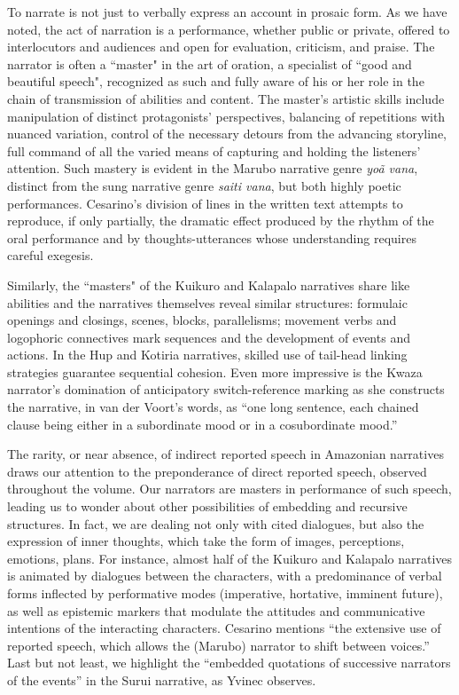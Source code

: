 \documentclass[output=paper,
modfonts,nonflat
]{langsci/langscibook}
\begin{document}
To narrate is not just to verbally express an account in prosaic form. As we have noted, the act of narration is a performance, whether public or private, offered to interlocutors and audiences and open for evaluation, criticism, and praise. The narrator is often a “master" in the art of oration, a specialist of “good and beautiful speech", recognized as such and fully aware of his or her role in the chain of transmission of abilities and content. The master’s artistic skills include manipulation of distinct protagonists’ perspectives, balancing of repetitions with nuanced variation, control of the necessary detours from the advancing storyline, full command of all the varied means of capturing and holding the listeners’ attention. 
Such mastery is evident in the Marubo narrative genre \textit{yoã vana}, distinct from the sung narrative genre \textit{saiti vana}, but both highly poetic performances. Cesarino’s division of lines in the written text attempts to reproduce, if  only partially, the dramatic effect produced by the rhythm of the oral performance and by thoughts-utterances whose understanding requires careful exegesis.
    
Similarly, the “masters" of the Kuikuro and Kalapalo narratives share like abilities and the narratives themselves reveal similar structures: formulaic openings and closings, scenes, blocks, parallelisms; movement verbs and logophoric connectives mark sequences and the development of events and actions. In the Hup and Kotiria narratives, skilled use of tail-head linking strategies guarantee sequential cohesion. Even more impressive is the Kwaza narrator's domination of anticipatory switch-reference marking as she constructs the narrative, in van der Voort’s words, as “one long sentence, each chained clause being either in a subordinate mood or in a cosubordinate mood.” 
    
    The rarity, or near absence, of indirect reported speech in Amazonian narratives draws our attention to the preponderance of direct reported speech, observed throughout the volume. Our narrators are masters in performance of such speech, leading us to wonder about other possibilities of embedding and recursive structures. In fact, we are dealing not only with cited dialogues, but also the expression of inner thoughts, which take the form of images, perceptions, emotions, plans. 
For instance, almost half of the Kuikuro and Kalapalo narratives is animated by dialogues between the characters, with a predominance of verbal forms inflected by performative modes (imperative, hortative, imminent future), as well as epistemic markers that modulate the attitudes and communicative intentions of the interacting characters. Cesarino mentions “the extensive use of reported speech, which allows the (Marubo) narrator to shift between voices.” Last but not least, we highlight the “embedded quotations of successive narrators of the events” in the Surui narrative, as Yvinec observes. 
\end{document}
